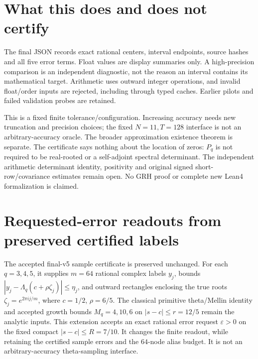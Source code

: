 \documentclass[11pt]{article}
\begin{document}
\section{What this does and does not certify}
The final JSON records exact rational centers, interval endpoints, source
hashes and all five error terms. Float values are display summaries only.
A high-precision comparison is an independent diagnostic, not the reason
an interval contains its mathematical target. Arithmetic uses outward
integer operations, and invalid float/order inputs are rejected, including
through typed caches. Earlier pilots and failed validation probes are retained.

This is a fixed finite tolerance/configuration. Increasing accuracy needs
new truncation and precision choices; the fixed $N=11,T=128$ interface is
not an arbitrary-accuracy oracle. The broader approximation existence theorem
is separate. The certificate says nothing about the location of zeros:
$P_q$ is not required to be real-rooted or a self-adjoint spectral determinant.
The independent arithmetic determinant identity, positivity and original
signed short-row/covariance estimates remain open. No GRH proof or complete
new Lean4 formalization is claimed.

\section{Requested-error readouts from preserved certified labels}\label{ar:requested}
The accepted final-v5 sample certificate is preserved unchanged. For each
$q=3,4,5$, it supplies $m=64$ rational complex labels $y_j$, bounds
$|y_j-\Lambda_q(c+\rho\zeta_j)|\le\eta_j$, and outward rectangles enclosing
the true roots $\zeta_j=e^{2\pi i j/m}$, where $c=1/2$, $\rho=6/5$.
The classical primitive theta/Mellin identity and accepted growth bounds
$M_q=4,10,6$ on $|s-c|\le r=12/5$ remain the analytic inputs.
This extension accepts an exact rational error request $\varepsilon>0$ on
the fixed compact $|s-c|\le R=7/10$. It changes the finite readout, while
retaining the certified sample errors and the $64$-node alias budget.
It is not an arbitrary-accuracy theta-sampling interface.
\end{document}
